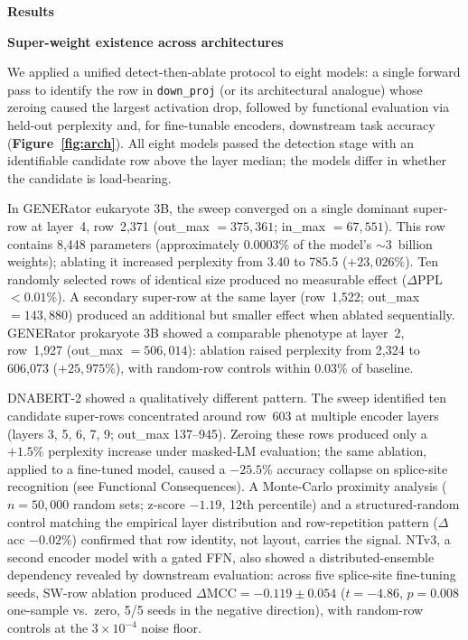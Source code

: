 \documentclass[11pt]{article}
\begin{document}
\textbf{Results}

\medskip
\noindent\textbf{Super-weight existence across architectures}

We applied a unified detect-then-ablate protocol to eight models: a
single forward pass to identify the row in \texttt{down\_proj} (or
its architectural analogue) whose zeroing caused the largest
activation drop, followed by functional evaluation via held-out
perplexity and, for fine-tunable encoders, downstream task accuracy
(\textbf{Figure~\ref{fig:arch}}). All eight models passed the
detection stage with an identifiable candidate row above the layer
median; the models differ in whether the candidate is load-bearing.

In GENERator eukaryote 3B, the sweep converged on a single dominant
super-row at layer~4, row~2{,}371 (out\_max $= 375{,}361$;
in\_max $= 67{,}551$). This row contains 8{,}448 parameters
(approximately 0.0003\% of the model's $\sim 3$~billion weights);
ablating it increased perplexity from 3.40 to 785.5 ($+23{,}026\%$).
Ten randomly selected rows of identical size produced no measurable
effect ($\Delta$PPL $< 0.01\%$). A secondary super-row at the same
layer (row~1{,}522; out\_max $= 143{,}880$) produced an additional
but smaller effect when ablated sequentially. GENERator prokaryote
3B showed a comparable phenotype at layer~2, row~1{,}927
(out\_max $= 506{,}014$): ablation raised perplexity from 2{,}324 to
606{,}073 ($+25{,}975\%$), with random-row controls within 0.03\%
of baseline.

DNABERT-2 showed a qualitatively different pattern. The sweep
identified ten candidate super-rows concentrated around row~603 at
multiple encoder layers (layers 3, 5, 6, 7, 9; out\_max 137--945).
Zeroing these rows produced only a $+1.5\%$ perplexity increase
under masked-LM evaluation; the same ablation, applied to a
fine-tuned model, caused a $-25.5\%$ accuracy collapse on splice-site
recognition (see Functional Consequences). A Monte-Carlo proximity
analysis ($n = 50{,}000$ random sets; z-score $-1.19$, 12th
percentile) and a structured-random control matching the empirical
layer distribution and row-repetition pattern ($\Delta$acc
$-0.02\%$) confirmed that row identity, not layout, carries the
signal. NTv3, a second encoder model with a gated FFN, also showed a
distributed-ensemble dependency revealed by downstream evaluation:
across five splice-site fine-tuning seeds, SW-row ablation produced
$\Delta\mathrm{MCC} = -0.119 \pm 0.054$ ($t = -4.86$, $p = 0.008$
one-sample vs.\ zero, 5/5 seeds in the negative direction), with
random-row controls at the $3 \times 10^{-4}$ noise floor.
\end{document}
